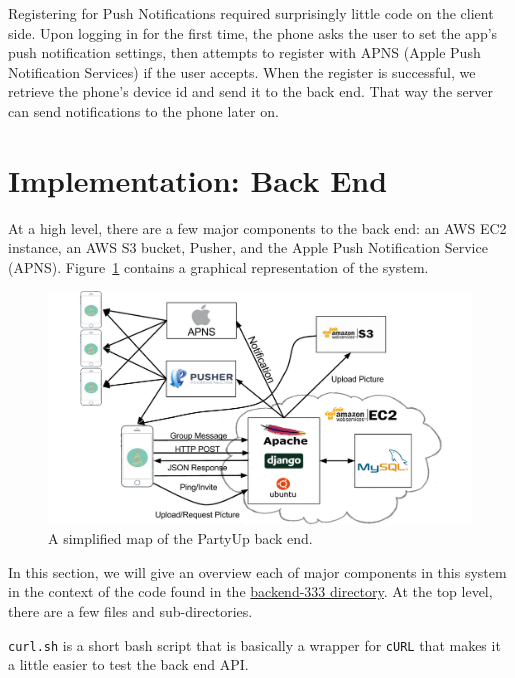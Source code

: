\documentclass[12pt]{article}
\begin{document}
Registering for Push Notifications required surprisingly little code on the client side. Upon logging in for
the first time, the phone asks the user to set the app's push notification settings, then attempts
to register with APNS (Apple Push Notification Services) if the user accepts. When the register
is successful, we retrieve the phone's device id and send it to the back end. That way the server can
send notifications to the phone later on.


\section{Implementation: Back End}

At a high level, there are a few major components to the back end:
an AWS EC2 instance, an AWS S3 bucket, Pusher, and the Apple Push Notification Service (APNS).
Figure~\ref{fig:stack} contains a graphical representation of the system.

\begin{figure}[h]
    \centering
    \includegraphics[scale=0.4]{Stack.png}
    \caption{
        A simplified map of the PartyUp back end. 
    }
    \label{fig:stack}
\end{figure}


In this section, we will give an overview each of major components in this system
in the context of the code found in the
\href{https://github.com/BDGL-Hacks/backend-333}{backend-333 directory}.
At the top level, there are a few files and sub-directories.

\texttt{curl.sh} is a short bash script that is basically a wrapper for 
\texttt{cURL} that makes it a little easier to test the back end API.
\end{document}
